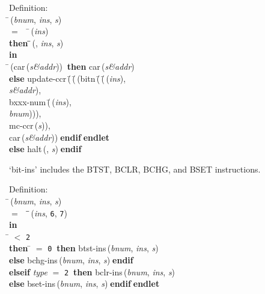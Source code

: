 \begin{tabbing}{\sc Definition}: \\  
\=\,({\it{bnum\/}}, {\it{ins\/}}, {\it{s\/}}) \\ 
$=$$\;\;\;\;$\=\,({\it{ins\/}}) \\ 
{\bf then }\=\=\,({}, {\it{ins\/}}, {\it{s\/}})\- \\ 
{\bf in} \\ 
\=\,({\rm{car}}\,({\it{s\&addr\/}}))$\;\;${\bf then }{\rm{car}}\,({\it{s\&addr\/}}) \\ 
{\bf else }{\rm{update-ccr}}\,(\=\,(\=\,({\rm{bitn}}\,(\=\,(\=\,({\it{ins\/}}), \\ 
{\it{s\&addr\/}})\-, \\ 
{\rm{bxxx-num}}\,(\=\,({\it{ins\/}}), \\ 
{\it{bnum\/}})\-)\-), \\ 
{\rm{mc-ccr}}\,({\it{s\/}}))\-, \\ 
{\rm{car}}\,({\it{s\&addr\/}}))\-$\;${\bf  endif}\-$\;${\bf  endlet}\- \\ 
{\bf else }{\rm{halt}}\,({}, {\it{s\/}})$\;${\bf  endif}\-\-
\end{tabbing}

 `bit-ins' includes the BTST, BCLR, BCHG, and BSET instructions.
\begin{tabbing}{\sc Definition}: \\  
\=\,({\it{bnum\/}}, {\it{ins\/}}, {\it{s\/}}) \\ 
$=$$\;\;\;\;$\=\=\,({\it{ins\/}}, {\tt{6}}, {\tt{7}})\- \\ 
{\bf in} \\ 
\= $<$ {\tt{2}} \\ 
{\bf then }\= $=$ {\tt{0}}$\;\;${\bf then }{\rm{btst-ins}}\,({\it{bnum\/}}, {\it{ins\/}}, {\it{s\/}}) \\ 
{\bf else }{\rm{bchg-ins}}\,({\it{bnum\/}}, {\it{ins\/}}, {\it{s\/}})$\;${\bf  endif}\- \\ 
{\bf elseif }{\it{type\/}} $=$ {\tt{2}}$\;\;${\bf then }{\rm{bclr-ins}}\,({\it{bnum\/}}, {\it{ins\/}}, {\it{s\/}}) \\ 
{\bf else }{\rm{bset-ins}}\,({\it{bnum\/}}, {\it{ins\/}}, {\it{s\/}})$\;${\bf  endif}\-$\;${\bf  endlet}\-\-
\end{tabbing}


